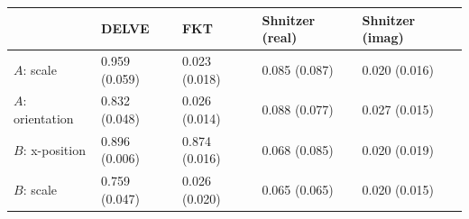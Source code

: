 \begin{tabular}{lllll}
\toprule
 & DELVE & FKT & Shnitzer (real) & Shnitzer (imag) \\
\midrule
$A$: scale & 0.959 (0.059) & 0.023 (0.018) & 0.085 (0.087) & 0.020 (0.016) \\
$A$: orientation & 0.832 (0.048) & 0.026 (0.014) & 0.088 (0.077) & 0.027 (0.015) \\
$B$: x-position & 0.896 (0.006) & 0.874 (0.016) & 0.068 (0.085) & 0.020 (0.019) \\
$B$: scale & 0.759 (0.047) & 0.026 (0.020) & 0.065 (0.065) & 0.020 (0.015) \\
\bottomrule
\end{tabular}
